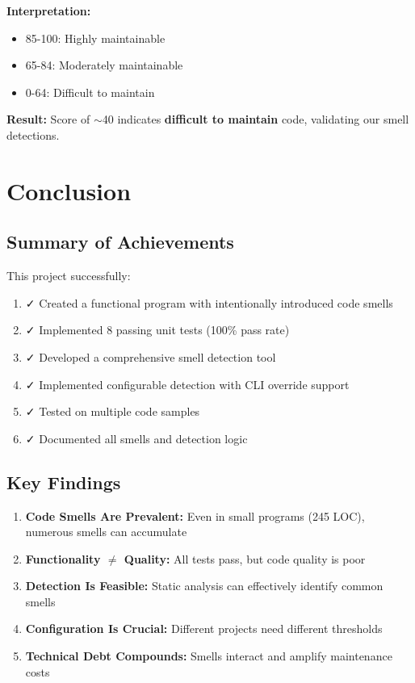 \documentclass[11pt,a4paper]{article}
\begin{document}
\textbf{Interpretation:}
\begin{itemize}[noitemsep]
    \item 85-100: Highly maintainable
    \item 65-84: Moderately maintainable
    \item 0-64: Difficult to maintain
\end{itemize}

\textbf{Result:} Score of $\sim$40 indicates \textbf{difficult to maintain} code, validating our smell detections.

\section{Conclusion}

\subsection{Summary of Achievements}

This project successfully:

\begin{enumerate}[noitemsep]
    \item ✓ Created a functional program with intentionally introduced code smells
    \item ✓ Implemented 8 passing unit tests (100\% pass rate)
    \item ✓ Developed a comprehensive smell detection tool
    \item ✓ Implemented configurable detection with CLI override support
    \item ✓ Tested on multiple code samples
    \item ✓ Documented all smells and detection logic
\end{enumerate}

\subsection{Key Findings}

\begin{enumerate}[noitemsep]
    \item \textbf{Code Smells Are Prevalent:} Even in small programs (245 LOC), numerous smells can accumulate
    \item \textbf{Functionality $\neq$ Quality:} All tests pass, but code quality is poor
    \item \textbf{Detection Is Feasible:} Static analysis can effectively identify common smells
    \item \textbf{Configuration Is Crucial:} Different projects need different thresholds
    \item \textbf{Technical Debt Compounds:} Smells interact and amplify maintenance costs
\end{enumerate}
\end{document}
